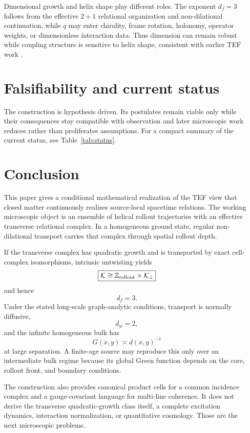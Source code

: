 \documentclass[11pt]{article}
\newcommand{\Z}{\mathbb{Z}}
\newcommand{\cK}{\mathcal{K}}
\begin{document}
Dimensional growth and helix shape play different roles. The exponent \(d_f=3\) follows from the effective \(2+1\) relational organization and non-dilational continuation, while \(q\) may enter chirality, frame rotation, holonomy, operator weights, or dimensionless interaction data. Thus dimension can remain robust while coupling structure is sensitive to helix shape, consistent with earlier TEF work \cite{WuHelix2026,WuAlpha2026}.

\section{Falsifiability and current status}

The construction is hypothesis driven. Its postulates remain viable only while their consequences stay compatible with observation and later microscopic work reduces rather than proliferates assumptions. For a compact summary of the current status, see Table~\ref{tab:status}.


\section{Conclusion}

This paper gives a conditional mathematical realization of the TEF view that closed matter continuously realizes source-local spacetime relations. The working microscopic object is an ensemble of helical rollout trajectories with an effective transverse relational complex. In a homogeneous ground state, regular non-dilational transport carries that complex through spatial rollout depth.

If the transverse complex has quadratic growth and is transported by exact cell-complex isomorphisms, intrinsic untwisting yields
\[
\boxed{
\cK\cong\Z_{\rm rollout}\times\cK_\perp
}
\]
and hence
\[
\boxed{d_f=3.}
\]
Under the stated long-scale graph-analytic conditions, transport is normally diffusive,
\[
\boxed{d_w=2,}
\]
and the infinite homogeneous bulk has
\[
\boxed{
G(x,y)\asymp d(x,y)^{-1}
}
\]
at large separation. A finite-age source may reproduce this only over an intermediate bulk regime because its global Green function depends on the core, rollout front, and boundary conditions.

The construction also provides canonical product cells for a common incidence complex and a gauge-covariant language for multi-line coherence. It does not derive the transverse quadratic-growth class itself, a complete excitation dynamics, interaction normalization, or quantitative cosmology. Those are the next microscopic problems.
\end{document}

